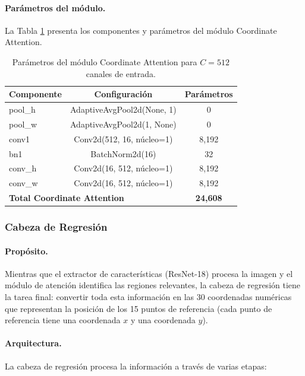 \paragraph{Parámetros del módulo.}
La Tabla \ref{tab:coord_attention_params} presenta los componentes y parámetros del módulo Coordinate Attention.

\begin{table}[htbp]
    \centering
    \caption{Parámetros del módulo Coordinate Attention para $C=512$ canales de entrada.}
    \label{tab:coord_attention_params}
    \small
    \begin{tabular}{@{}lcc@{}}
        \toprule
        \textbf{Componente} & \textbf{Configuración} & \textbf{Parámetros} \\
        \midrule
        pool\_h & AdaptiveAvgPool2d(None, 1) & 0 \\
        pool\_w & AdaptiveAvgPool2d(1, None) & 0 \\
        conv1 & Conv2d(512, 16, núcleo=1) & 8,192 \\
        bn1 & BatchNorm2d(16) & 32 \\
        conv\_h & Conv2d(16, 512, núcleo=1) & 8,192 \\
        conv\_w & Conv2d(16, 512, núcleo=1) & 8,192 \\
        \midrule
        \multicolumn{2}{l}{\textbf{Total Coordinate Attention}} & \textbf{24,608} \\
        \bottomrule
    \end{tabular}

    \vspace{0.5em}
\end{table}

\subsubsection{Cabeza de Regresión}

\paragraph{Propósito.}
Mientras que el extractor de características (ResNet-18) procesa la imagen y el módulo de atención identifica las regiones relevantes, la cabeza de regresión tiene la tarea final: convertir toda esta información en las 30 coordenadas numéricas que representan la posición de los 15 puntos de referencia (cada punto de referencia tiene una coordenada $x$ y una coordenada $y$).

\paragraph{Arquitectura.}
La cabeza de regresión procesa la información a través de varias etapas:

